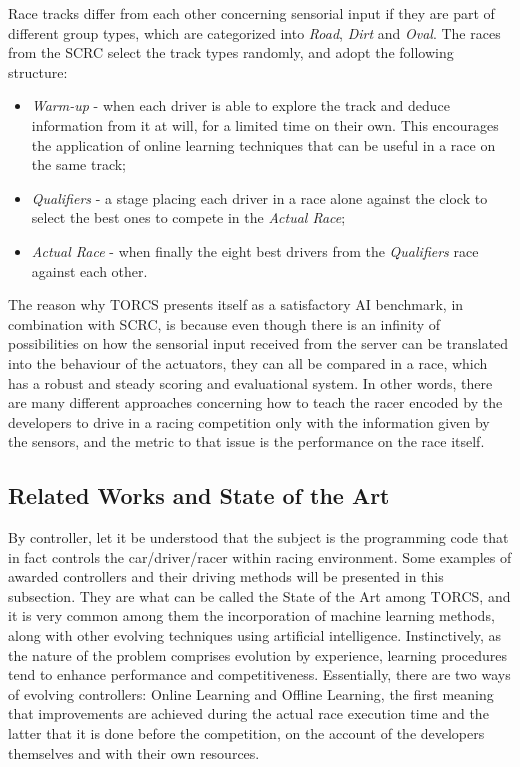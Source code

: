 	Race tracks differ from each other concerning sensorial input if they are part of different group types, which
	are categorized into \emph{Road}, \emph{Dirt} and \emph{Oval}. The races from the SCRC select the track types
	randomly, and adopt the following structure:
	
		\begin{itemize}
			
			\item \emph{Warm-up} - when each driver is able to explore the track and deduce information from it	at
			will, for a limited time on their own. This encourages the application of online learning techniques
			that can be useful in a race on the same track;
			
			\item \emph{Qualifiers} - a stage placing each driver in a race alone against the clock to select the best
			ones to compete in the \emph{Actual Race};
			
			\item \emph{Actual Race} - when finally the eight best drivers from the \emph{Qualifiers} race against
			each other.
			
		\end{itemize}
	
	The reason why TORCS presents itself as a satisfactory AI benchmark, in combination with SCRC, is because even
	though there is an infinity of possibilities on how the sensorial input received from the server can be
	translated into the behaviour of the actuators, they can all be compared in a race, which has a robust and steady
	scoring and evaluational system. In other words, there are many different approaches concerning how to teach the
	racer encoded by the developers to drive in a racing competition only with the information given by the sensors,
	and the metric to that issue is the performance on the race itself.

\subsection{Related Works and State of the Art} \label{subsec:Related}
	
	By controller, let it be understood that the subject is the programming code that in fact controls the
	car/driver/racer within racing environment. Some examples of awarded controllers and their driving methods
	will be presented in this subsection. They are what can be called the State of the Art among TORCS, and it is
	very common among them the incorporation of machine learning methods, along with other evolving techniques
	using artificial intelligence. Instinctively, as the nature of the problem comprises evolution by experience,
	learning procedures tend to enhance performance and competitiveness. Essentially, there are two ways of
	evolving controllers: Online Learning and Offline Learning, the first meaning that improvements are achieved
	during the actual race execution time and the latter that it is done before the competition, on the account of
	the developers themselves and with their own resources.
	
